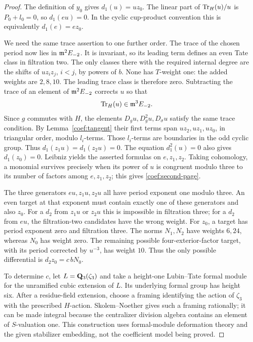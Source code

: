 \begin{proof}
The definition of \(y_0\) gives \(d_1(u)=uz_0\).  The linear part of
\(\operatorname{Tr}_H(u)/u\) is \(P_0+l_0=0\), so \(d_1(eu)=0\).  In the cyclic
cup-product convention this is equivalently \(d_1(e)=ez_0\).

We need the same trace assertion to one further order.  The trace of
the chosen period now lies in \(\mathfrak m^2E_{-2}\).  It is invariant, so its
leading term defines an even Tate class in filtration two.  The only
classes there with the required internal degree are the shifts of
\(uz_i z_j\), \(i<j\), by powers of \(b\).  None has \(T\)-weight one:
the added weights are \(2,8,10\).  The leading trace class is therefore
zero.  Subtracting the trace of an element of \(\mathfrak m^2E_{-2}\) corrects
\(u\) so that
\[
 \operatorname{Tr}_H(u)\in\mathfrak m^3E_{-2}.
\]
Since \(g\) commutes with \(H\), the elements \(D_g u,D_g^2u,D_\sigma u\)
satisfy the same trace condition.  By
Lemma~\ref{coef:tangent} their first terms span
\(uz_2,uz_1,uz_0\), in triangular order, modulo \(l_i\)-terms.
Those \(l_i\)-terms are boundaries in the odd cyclic group.
Thus \(d_1(z_1u)=d_1(z_2u)=0\).  The equation \(d_1^2(u)=0\)
also gives \(d_1(z_0)=0\).
Leibniz yields the asserted formulas on \(e,z_1,z_2\).
Taking cohomology, a monomial survives precisely when its power of
\(u\) is congruent modulo three to its number of factors among
\(e,z_1,z_2\); this gives \eqref{coef:second-page}.

The three generators \(eu,z_1u,z_2u\) all have period exponent one
modulo three.  An even target at that exponent must contain exactly
one of these generators and also \(z_0\).  For a \(d_2\) from \(z_1u\)
or \(z_2u\) this is impossible in filtration three; for a \(d_2\) from
\(eu\), the filtration-two candidates have the wrong weight.
For \(z_0\), a target has period exponent zero and filtration three.
The norms \(N_1,N_2\) have weights \(6,24\), whereas \(N_0\) has
weight zero.  The remaining possible four-exterior-factor target,
with its period corrected by \(u^{-3}\), has weight \(10\).
Thus the only possible differential is \(d_2z_0=c\,bN_0\).

To determine \(c\), let \(L=\mathbf Q_3(\zeta_3)\) and take a height-one
Lubin--Tate formal module for the unramified cubic extension of \(L\).
Its underlying formal group has height six.  After a residue-field
extension, choose a framing identifying the action of \(\zeta_3\)
with the prescribed \(H\)-action.  Skolem--Noether gives such a
framing rationally; it can be made integral because the centralizer
division algebra contains an element of \(S\)-valuation one.
This construction uses formal-module deformation theory and the
given stabilizer embedding, not the coefficient model being proved.


\end{proof}
